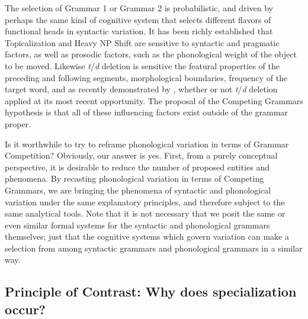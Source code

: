 The selection of Grammar 1 or Grammar 2 is probabilistic, and driven by perhaps the same kind of cognitive system that selects different flavors of functional heads in syntactic variation.
It has been richly established that Topicalization and Heavy NP Shift are sensitive to syntactic and pragmatic factors, as well as prosodic factors, such as the phonological weight of the object to be moved. %
Likewise {\sl t}/{\sl d} deletion is sensitive the featural properties of the preceding and following segments, morphological boundaries, frequency of the target word, and as recently demonstrated by \citet{MacKenzie.Tamminga2012}, whether or not {\sl t}/{\sl d} deletion applied at its most recent opportunity.
The proposal of the Competing Grammars hypothesis is that all of these influencing factors exist outside of the grammar proper.

Is it worthwhile to try to reframe phonological variation in terms of Grammar Competition?
Obviously, our answer is yes.
First, from a purely conceptual perspective, it is desirable to reduce the number of proposed entities and phenomena.
By recasting phonological variation in terms of Competing Grammars, we are bringing the phenomena of syntactic and phonological variation under the same explanatory principles, and therefore subject to the same analytical tools.
Note that it is not necessary that we posit the same or even similar formal systems for the syntactic and phonological grammars themselves; just that the cognitive systems which govern variation can make a selection from among syntactic grammars and phonological grammars in a similar way.






\subsection{Principle of Contrast: Why does specialization occur?}

